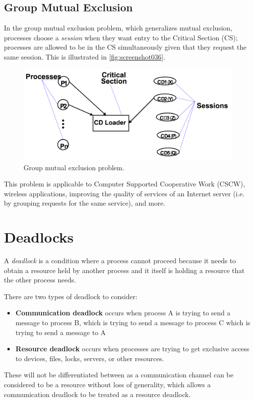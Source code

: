 \subsection{Group Mutual Exclusion}
In the group mutual exclusion problem, which generalizes mutual exclusion, processes choose a \textit{session} when they want entry to the Critical Section (CS); processes are allowed to be in the CS simultaneously given that they request the same session. This is illustrated in \autoref{fig:screenshot036}.

\begin{figure}
\centering
\includegraphics[width=0.7\linewidth]{figures/screenshot036}
\caption{Group mutual exclusion problem.}
\label{fig:screenshot036}
\end{figure}

This problem is applicable to Computer Supported Cooperative Work (CSCW), wireless applications, improving the quality of services of an Internet server (i.e. by grouping requests for the same service), and more.

\section{Deadlocks}
A \textit{deadlock} is a condition where a process cannot proceed because it needs to obtain a resource held by another process and it itself is holding a resource that the other process needs. 

There are two types of deadlock to consider:
\begin{itemize}
\item \textbf{Communication deadlock} occurs when process A is trying to send a message to process B, which is trying to send a message to process C which is trying to send a message to A
\item \textbf{Resource deadlock} occurs when processes are trying to get exclusive access to devices, files, locks, servers, or other resources.
\end{itemize}

These will not be differentiated between as a communication channel can be considered to be a resource without loss of generality, which allows a communication deadlock to be treated as a resource deadlock.

